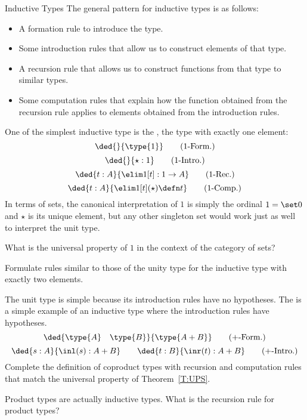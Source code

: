 \begin{unit}{Inductive Types}
The general pattern for inductive types is as follows:
\begin{itemize}
\item A formation rule to introduce the type.
\item Some introduction rules that allow us to construct elements of that type.
\item A recursion rule that allows us to construct functions from that type to similar types.
\item Some computation rules that explain how the function obtained from the recursion rule applies to elements obtained from the introduction rules. 
\end{itemize}
One of the simplest inductive type is the , the type with exactly one element: 
\[\ded{}{\type{1}} \tag{$1$-Form.}\]
\[\ded{}{\star : 1} \tag{$1$-Intro.}\]
\[\ded{t:A}{\elim1[t]:1 \to A} \tag{$1$-Rec.}\]
\[\ded{t:A}{\elim1[t](\star) \defn t} \tag{$1$-Comp.}\]
In terms of sets, the canonical interpretation of \(1\) is simply the ordinal \(1 = \set0\) and \(\star\) is its unique element, but any other singleton set would work just as well to interpret the unit type.

\begin{problem}
  What is the universal property of \(1\) in the context of the category of sets?
\end{problem}

\begin{problem}
  \mbox{}%
  Formulate rules similar to those of the unity type for the inductive type with exactly two elements.
\end{problem}

\begin{problem}
  The unit type is simple because its introduction rules have no hypotheses.
  The  is a simple example of an inductive type where the introduction rules have hypotheses.
  \[\ded{\type{A} \quad \type{B}}{\type{A + B}} \tag{$+$-Form.}\]
  \[\ded{s : A}{\inl(s) : A + B} \qquad \ded{t : B}{\inr(t) : A + B} \tag{$+$-Intro.}\]
  Complete the definition of coproduct types with recursion and computation rules that match the universal property of Theorem~\ref{T:UPS}.
\end{problem}

\begin{problem}
  Product types are actually inductive types. What is the recursion rule for product types? 
\end{problem}


\end{unit}
